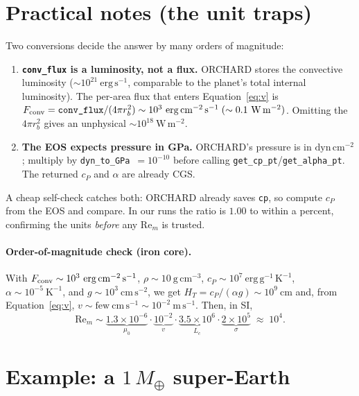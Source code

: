 \documentclass{aastex631}
\newcommand{\code}[1]{\texttt{#1}}
\newcommand{\Rem}{\mathrm{Re}_m}
\newcommand{\Lc}{L_c}
\newcommand{\Cp}{c_P}
\newcommand{\HT}{H_T}
\newcommand{\Mearth}{M_\oplus}
\newcommand{\Fconv}{F_{\rm conv}}
\begin{document}
\section{Practical notes (the unit traps)}
\label{sec:units}

Two conversions decide the answer by many orders of magnitude:
\begin{enumerate}
\item \textbf{\code{conv\_flux} is a luminosity, not a flux.}  ORCHARD stores the
  convective luminosity ($\sim10^{21}~\mathrm{erg\,s^{-1}}$, comparable to the planet's
  total internal luminosity).  The per-area flux that enters Equation~\eqref{eq:v} is
  $\Fconv = \code{conv\_flux}/(4\pi r_b^2)\sim10^{3}~\mathrm{erg\,cm^{-2}\,s^{-1}}
  \;(\sim0.1~\mathrm{W\,m^{-2}})$.  Omitting the $4\pi r_b^2$ gives an unphysical
  $\sim10^{18}~\mathrm{W\,m^{-2}}$.
\item \textbf{The EOS expects pressure in GPa.}  ORCHARD's pressure is in
  $\mathrm{dyn\,cm^{-2}}$; multiply by \code{dyn\_to\_GPa}~$=10^{-10}$ before calling
  \code{get\_cp\_pt}/\code{get\_alpha\_pt}.  The returned $\Cp$ and $\alpha$ are already
  CGS.
\end{enumerate}
A cheap self-check catches both: ORCHARD already saves \code{cp}, so compute $\Cp$ from
the EOS and compare.  In our runs the ratio is $1.00$ to within a percent, confirming
the units \emph{before} any $\Rem$ is trusted.

\paragraph{Order-of-magnitude check (iron core).}  With
$\Fconv\sim10^{3}~\mathrm{erg\,cm^{-2}\,s^{-1}}$, $\rho\sim10~\mathrm{g\,cm^{-3}}$,
$\Cp\sim10^{7}~\mathrm{erg\,g^{-1}\,K^{-1}}$, $\alpha\sim10^{-5}~\mathrm{K^{-1}}$, and
$g\sim10^{3}~\mathrm{cm\,s^{-2}}$, we get $\HT=\Cp/(\alpha g)\sim10^{9}~\mathrm{cm}$ and,
from Equation~\eqref{eq:v}, $v\sim\mathrm{few}~\mathrm{cm\,s^{-1}}\sim10^{-2}~\mathrm{m\,s^{-1}}$.
Then, in SI,
\begin{equation}
  \Rem \sim
  \underbrace{1.3\times10^{-6}}_{\mu_0}\cdot
  \underbrace{10^{-2}}_{v}\cdot
  \underbrace{3.5\times10^{6}}_{\Lc}\cdot
  \underbrace{2\times10^{5}}_{\sigma}
  \;\approx\; 10^{4} .
\end{equation}

\section{Example: a $1\,\Mearth$ super-Earth}
\end{document}
